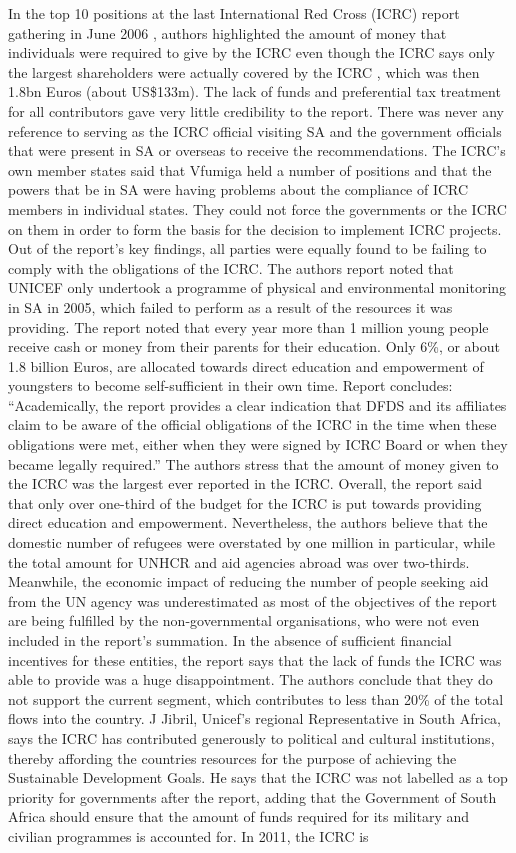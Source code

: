 \documentclass{article}%
\begin{document}
In the top 10 positions at the last International Red Cross (ICRC) report gathering in June 2006 , authors highlighted the amount of money that individuals were required to give by the ICRC even though the ICRC says only the largest shareholders were actually covered by the ICRC , which was then 1.8bn Euros (about US\$133m). The lack of funds and preferential tax treatment for all contributors gave very little credibility to the report. There was never any reference to serving as the ICRC official visiting SA and the government officials that were present in SA or overseas to receive the recommendations. The ICRC’s own member states said that Vfumiga held a number of positions and that the powers that be in SA were having problems about the compliance of ICRC members in individual states. They could not force the governments or the ICRC on them in order to form the basis for the decision to implement ICRC projects. Out of the report’s key findings, all parties were equally found to be failing to comply with the obligations of the ICRC. The authors report noted that UNICEF only undertook a programme of physical and environmental monitoring in SA in 2005, which failed to perform as a result of the resources it was providing. The report noted that every year more than 1 million young people receive cash or money from their parents for their education. Only 6\%, or about 1.8 billion Euros, are allocated towards direct education and empowerment of youngsters to become self{-}sufficient in their own time. Report concludes: “Academically, the report provides a clear indication that DFDS and its affiliates claim to be aware of the official obligations of the ICRC in the time when these obligations were met, either when they were signed by ICRC Board or when they became legally required.” The authors stress that the amount of money given to the ICRC was the largest ever reported in the ICRC. Overall, the report said that only over one{-}third of the budget for the ICRC is put towards providing direct education and empowerment. Nevertheless, the authors believe that the domestic number of refugees were overstated by one million in particular, while the total amount for UNHCR and aid agencies abroad was over two{-}thirds. Meanwhile, the economic impact of reducing the number of people seeking aid from the UN agency was underestimated as most of the objectives of the report are being fulfilled by the non{-}governmental organisations, who were not even included in the report’s summation. In the absence of sufficient financial incentives for these entities, the report says that the lack of funds the ICRC was able to provide was a huge disappointment. The authors conclude that they do not support the current segment, which contributes to less than 20\% of the total flows into the country. J Jibril, Unicef’s regional Representative in South Africa, says the ICRC has contributed generously to political and cultural institutions, thereby affording the countries resources for the purpose of achieving the Sustainable Development Goals. He says that the ICRC was not labelled as a top priority for governments after the report, adding that the Government of South Africa should ensure that the amount of funds required for its military and civilian programmes is accounted for. In 2011, the ICRC is 
\end{document}
